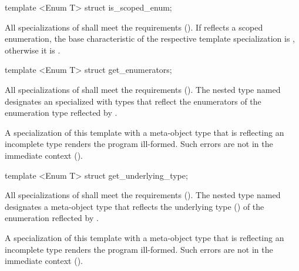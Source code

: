 \begin{std.txt}\color{addclr}

\begin{itemdecl}
template <Enum T> struct is_scoped_enum;
\end{itemdecl}

\begin{itemdescr}
\pnum
All specializations of  shall meet the  requirements (). If  reflects a scoped enumeration, the base characteristic of the respective template specialization is , otherwise it is .

\end{itemdescr}

\begin{itemdecl}
template <Enum T> struct get_enumerators;
\end{itemdecl}

\begin{itemdescr}
\pnum
All specializations of  shall meet the  requirements (). The nested type named  designates an  specialized with  types that reflect the enumerators of the enumeration type reflected by .

\pnum
\remarks
A specialization of this template with a meta-object type that is reflecting an incomplete type renders the program ill-formed.
      Such errors are not in the immediate context ().
\end{itemdescr}

\begin{itemdecl}
template <Enum T> struct get_underlying_type;
\end{itemdecl}

\begin{itemdescr}
\pnum
All specializations of  shall meet the
 requirements (). The nested type named
 designates a meta-object type that reflects the underlying type
() of the enumeration reflected by .

\pnum
\remarks
A specialization of this template with a meta-object type that is reflecting an incomplete type renders the program ill-formed.
      Such errors are not in the immediate context ().
\end{itemdescr}
\end{std.txt}

